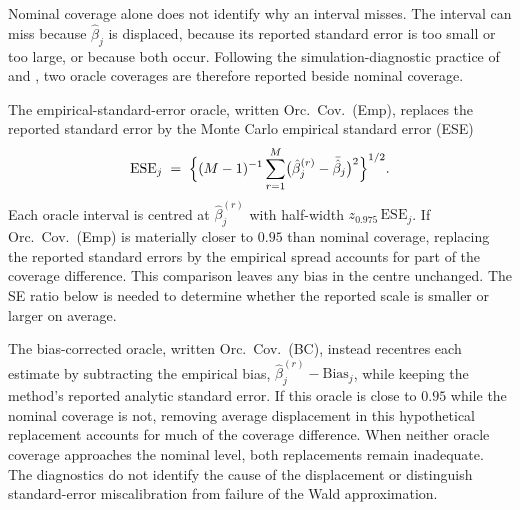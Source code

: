 Nominal coverage alone does not identify why an interval misses. The interval can miss because $\hat{\beta}_j$ is displaced, because its reported standard error is too small or too large, or because both occur. Following the simulation-diagnostic practice of \citet{williamson2026assessing} and \citet{morris2019using}, two oracle coverages are therefore reported beside nominal coverage.

The empirical-standard-error oracle, written Orc.\ Cov.\ (Emp), replaces the reported standard error by the Monte Carlo empirical standard error (ESE)
\begin{equation}
    \mathrm{ESE}_j
    \;=\; \Bigl\{ (M-1)^{-1} \sum_{r=1}^{M}
    \bigl(\hat{\beta}^{(r)}_j - \bar{\hat{\beta}}_j\bigr)^2
    \Bigr\}^{1/2}.
    \label{eq:eval_ese}
\end{equation}
Each oracle interval is centred at $\hat{\beta}^{(r)}_j$ with half-width $z_{0.975}\,\mathrm{ESE}_j$. If Orc.\ Cov.\ (Emp) is materially closer to $0.95$ than nominal coverage, replacing the reported standard errors by the empirical spread accounts for part of the coverage difference. This comparison leaves any bias in the centre unchanged. The SE ratio below is needed to determine whether the reported scale is smaller or larger on average.

The bias-corrected oracle, written Orc.\ Cov.\ (BC), instead recentres each estimate by subtracting the empirical bias, $\hat{\beta}^{(r)}_j - \mathrm{Bias}_j$, while keeping the method's reported analytic standard error. If this oracle is close to $0.95$ while the nominal coverage is not, removing average displacement in this hypothetical replacement accounts for much of the coverage difference. When neither oracle coverage approaches the nominal level, both replacements remain inadequate. The diagnostics do not identify the cause of the displacement or distinguish standard-error miscalibration from failure of the Wald approximation.

